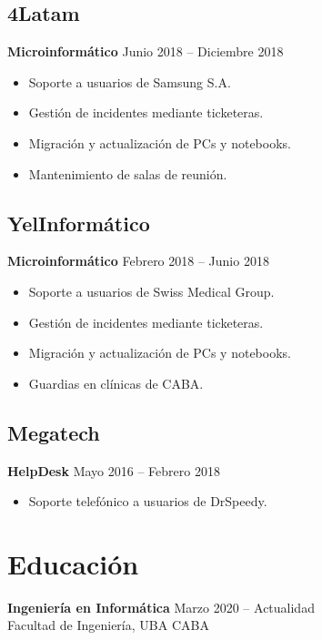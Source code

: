 \documentclass[a4paper,10pt]{article}
\begin{document}
\subsection*{\Large\textbf{4Latam}}
\textbf{\normalsize Microinformático} \hfill Junio 2018 – Diciembre 2018
\begin{itemize}
	\item Soporte a usuarios de Samsung S.A.
	\item Gestión de incidentes mediante ticketeras.
	\item Migración y actualización de PCs y notebooks.
	\item Mantenimiento de salas de reunión.
\end{itemize}

\subsection*{\Large\textbf{YelInformático}}
\textbf{\normalsize Microinformático} \hfill Febrero 2018 – Junio 2018
\begin{itemize}
	\item Soporte a usuarios de Swiss Medical Group.
	\item Gestión de incidentes mediante ticketeras.
	\item Migración y actualización de PCs y notebooks.
	\item Guardias en clínicas de CABA.
\end{itemize}

\subsection*{\Large\textbf{Megatech}}
\textbf{\normalsize HelpDesk} \hfill Mayo 2016 – Febrero 2018
\begin{itemize}
	\item Soporte telefónico a usuarios de DrSpeedy.
\end{itemize}

\vspace{0.5cm}

\section*{Educación}

\noindent \textbf{Ingeniería en Informática} \hfill Marzo 2020 – Actualidad \\
Facultad de Ingeniería, UBA \hfill CABA

\vspace{0.5cm}
\end{document}
